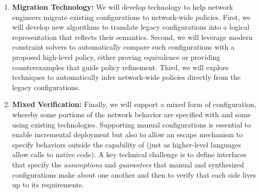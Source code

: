 \begin{enumerate}
\item {\bf Migration Technology:} We will develop technology to help network engineers migrate existing configurations to network-wide policies.  First, we will develop new algorithms to translate legacy configurations into a logical
representation that reflects their semantics.  Second, we will leverage modern constraint solvers to automatically compare such configurations with a proposed high-level policy, either proving equivalence or providing counterexamples that guide policy refinement.  Third, we will explore techniques to automatically infer network-wide policies directly from the legacy configurations.

\item {\bf Mixed Verification:} Finally, we will support a mixed form of configuration, whereby some portions of the network behavior are specified with \Name and some using existing technologies.  Supporting manual configurations is essential to enable incremental deployment but also to allow an escape mechanism to specify behaviors outside the capability of \Name (just as higher-level languages allow calls to native code).  A key technical challenge is to define interfaces that specify the \emph{assumptions} and \emph{guarantees} that manual and synthesized configurations make about one another and then to verify that each side lives up to its requirements. 
\end{enumerate}


